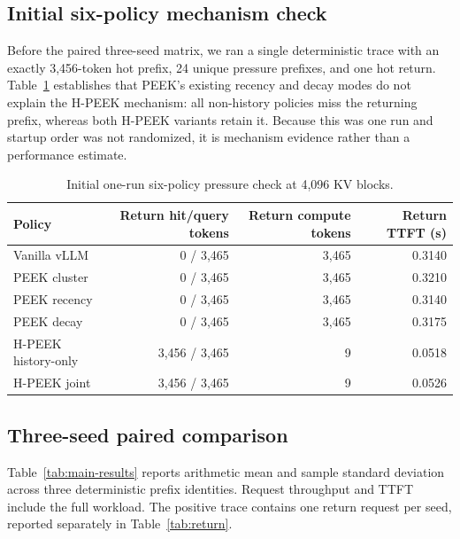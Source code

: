 \documentclass[10pt,twocolumn]{article}
\begin{document}
\subsection{Initial six-policy mechanism check}

Before the paired three-seed matrix, we ran a single deterministic trace with
an exactly 3,456-token hot prefix, 24 unique pressure prefixes, and one hot
return. Table~\ref{tab:six-policy} establishes that PEEK's existing recency and
decay modes do not explain the H-PEEK mechanism: all non-history policies miss
the returning prefix, whereas both H-PEEK variants retain it. Because this was
one run and startup order was not randomized, it is mechanism evidence rather
than a performance estimate.

\begin{table}[t]
  \centering
  \caption{Initial one-run six-policy pressure check at 4,096 KV blocks.}
  \label{tab:six-policy}
  \begin{tabular}{lrrr}
    \toprule
    Policy & Return hit/query tokens & Return compute tokens & Return TTFT (s) \\
    \midrule
    Vanilla vLLM & 0 / 3,465 & 3,465 & 0.3140 \\
    PEEK cluster & 0 / 3,465 & 3,465 & 0.3210 \\
    PEEK recency & 0 / 3,465 & 3,465 & 0.3140 \\
    PEEK decay & 0 / 3,465 & 3,465 & 0.3175 \\
    H-PEEK history-only & 3,456 / 3,465 & 9 & 0.0518 \\
    H-PEEK joint & 3,456 / 3,465 & 9 & 0.0526 \\
    \bottomrule
  \end{tabular}
\end{table}

\subsection{Three-seed paired comparison}

Table~\ref{tab:main-results} reports arithmetic mean and sample standard
deviation across three deterministic prefix identities. Request throughput and
TTFT include the full workload. The positive trace contains one return request
per seed, reported separately in Table~\ref{tab:return}.
\end{document}
